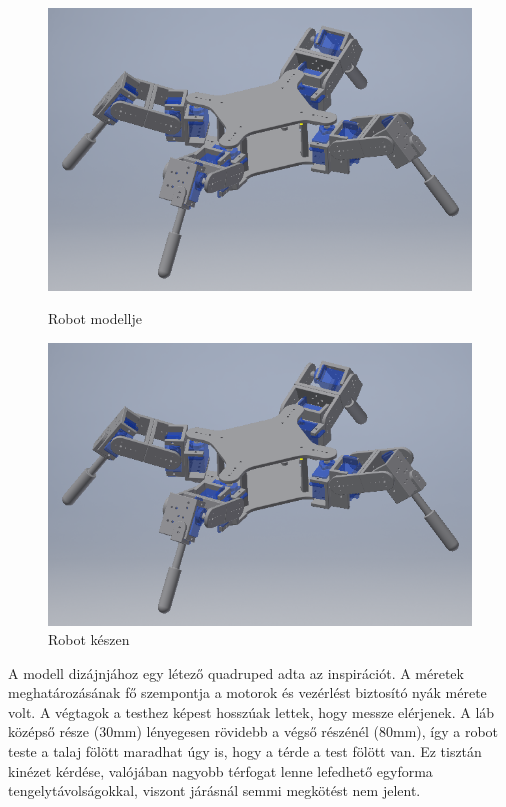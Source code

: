 \documentclass{article}
\begin{document}
\begin{figure}
\centering
\begin{minipage}{0.45\textwidth}
	\centering
	\includegraphics[width=\textwidth]{fullquad}
	\caption{Robot modellje}
\end{minipage}\hfill
\begin{minipage}{0.45\textwidth}
	\centering
	\includegraphics[width=\textwidth]{fullquad}
	\caption{Robot készen}
\end{minipage}
\end{figure}
A modell dizájnjához egy létező quadruped adta az inspirációt. A méretek meghatározásának fő szempontja a motorok és vezérlést biztosító nyák mérete volt. A végtagok a testhez képest hosszúak lettek, hogy messze elérjenek. A láb középső része (30mm) lényegesen rövidebb a végső részénél (80mm), így a robot teste a talaj fölött maradhat úgy is, hogy a térde a test fölött van. Ez tisztán kinézet kérdése, valójában nagyobb térfogat lenne lefedhető egyforma tengelytávolságokkal, viszont járásnál semmi megkötést nem jelent.
\end{document}
